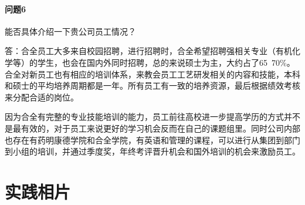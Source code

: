 \documentclass[twocolumn,openany]{ctexbook}
\begin{document}
	\paragraph{问题6}能否具体介绍一下贵公司员工情况？
	
	答：合全员工大多来自校园招聘，进行招聘时，合全希望招聘强相关专业（有机化学等）的学生，也会在国内外同时招聘，总的来说硕士为主，大约占了65~70\%。合全对新员工也有相应的培训体系，来教会员工工艺研发相关的内容和技能，本科和硕士的平均培养周期都是一年。所有员工有一致的培养资源，最后根据绩效考核来分配合适的岗位。
	
	因为合全有完整的专业技能培训的能力，员工前往高校进一步提高学历的方式并不是最有效的，对于员工来说更好的学习机会反而在自己的课题组里。同时公司内部也存在有药明康德学院和合全学院，有英语和管理的课程，可以进行从集团到部门到小组的培训，并通过季度奖，年终考评晋升机会和国外培训的机会来激励员工。
	
	
	\newpage
	
	\section*{实践相片}
	
\end{document}
